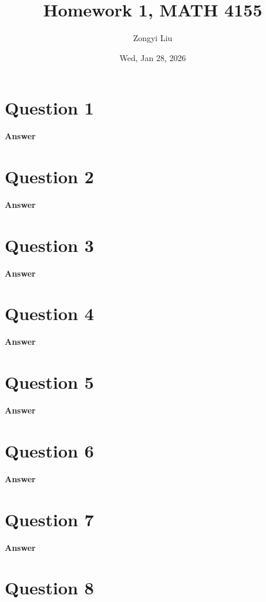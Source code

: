 \documentclass[letterpaper]{article}
\title{Homework 1, MATH 4155}
\author{Zongyi Liu}
\date{Wed, Jan 28, 2026}
\begin{document}
	\maketitle
\section{Question 1}

\textbf{Answer}

\clearpage

\section{Question 2}

\textbf{Answer}

\clearpage

\section{Question 3}

\textbf{Answer}

\clearpage

\section{Question 4}

\textbf{Answer}

\clearpage

\section{Question 5}

\textbf{Answer}

\clearpage

\section{Question 6}

\textbf{Answer}

\clearpage

\section{Question 7}

\textbf{Answer}

\clearpage

\section{Question 8}
\end{document}
